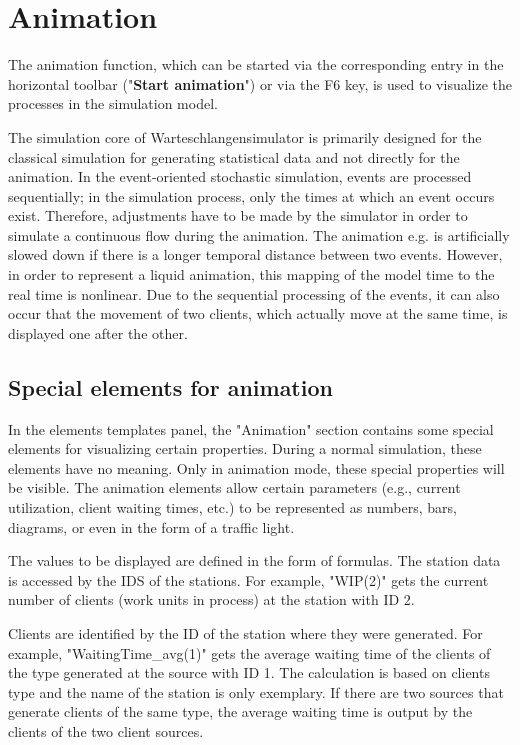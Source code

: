 \documentclass{svmono}
\begin{document}
\chapter{Animation}

The animation function, which can be started via the corresponding entry in the horizontal toolbar ("\textbf{Start animation}") or via the F6 key, is used to visualize the processes in the simulation model.

The simulation core of Warteschlangensimulator is primarily designed for the classical simulation for generating statistical data and not directly for the animation. In the event-oriented stochastic simulation, events are processed sequentially; in the simulation process, only the times at which an event occurs exist. Therefore, adjustments have to be made by the simulator in order to simulate a continuous flow during the animation. The animation e.g. is artificially slowed down if there is a longer temporal distance between two events. However, in order to represent a liquid animation, this mapping of the model time to the real time is nonlinear. Due to the sequential processing of the events, it can also occur that the movement of two clients, which actually move at the same time, is displayed one after the other.

\section{Special elements for animation}

In the elements templates panel, the "Animation" section contains some special elements for visualizing certain properties. During a normal simulation, these elements have no meaning. Only in animation mode, these special properties will be visible. The animation elements allow certain parameters (e.g., current utilization, client waiting times, etc.) to be represented as numbers, bars, diagrams, or even in the form of a traffic light.

The values to be displayed are defined in the form of formulas. The station data is accessed by the IDS of the stations. For example, "WIP(2)" gets the current number of clients (work units in process) at the station with ID 2.

Clients are identified by the ID of the station where they were generated. For example, "WaitingTime\_avg(1)" gets the average waiting time of the clients of the type generated at the source with ID 1. The calculation is based on clients type and the name of the station is only exemplary. If there are two sources that generate clients of the same type, the average waiting time is output by the clients of the two client sources.
 
\end{document}
